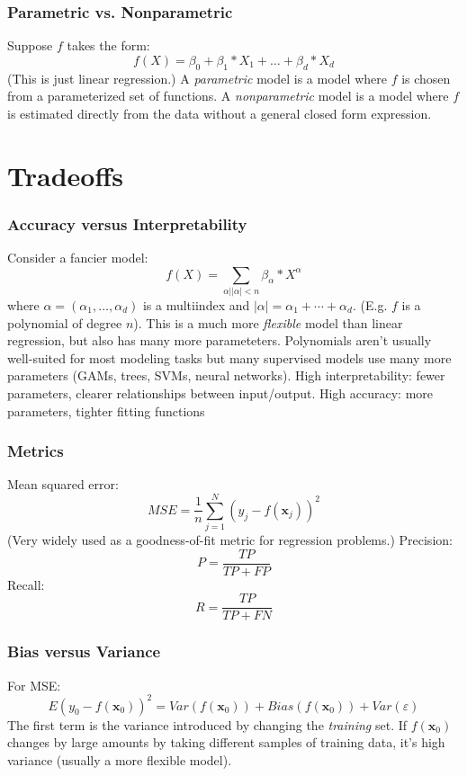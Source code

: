 \documentclass[
	11pt, %
]{beamer}
\begin{document}
\begin{frame}
	\frametitle{Parametric vs. Nonparametric}
	Suppose $f$ takes the form:
	\[ f(X) = \beta_0 + \beta_1*X_1 + \ldots + \beta_d * X_d \]
	\pause
	(This is just linear regression.)
	\vfill
	\pause
	A \emph{parametric} model is a model where $f$ is chosen from a parameterized set of functions.
	\vfill
	\pause
	A \emph{nonparametric} model is a model where $f$ is estimated directly from the data without a general closed form expression. 
	\vfill
\end{frame}

\section{Tradeoffs}
\begin{frame}
	\frametitle{Accuracy versus Interpretability}
	Consider a fancier model:
	\[
		f(X) = \sum_{\alpha | |\alpha| < n} \beta_\alpha * X^{\alpha}
	\]
	where $\alpha = (\alpha_1, \ldots, \alpha_d)$ is a multiindex and $|\alpha| = \alpha_1 + \cdots + \alpha_d$. (E.g. $f$ is a polynomial of degree $n$). 
	\vfill
	\pause
	This is a much more \emph{flexible} model than linear regression, but also has many more parameteters. 
	\vfill
	\pause
	Polynomials aren't usually well-suited for most modeling tasks but many supervised models use many more parameters (GAMs, trees, SVMs, neural networks). 
	\vfill
	\pause
	High interpretability: fewer parameters, clearer relationships between input/output.
	High accuracy: more parameters, tighter fitting functions
\end{frame}

\begin{frame}
	\frametitle{Metrics}
	Mean squared error:
	\[
		MSE = \frac{1}{n} \sum_{j=1}^N (y_j - f(\mathbf{x}_j))^2
	\]
	(Very widely used as a goodness-of-fit metric for regression problems.)
	\vfill
	\pause
	Precision:
	\[
		P = \frac{TP}{TP + FP}
	\]
	\vfill
	Recall:
	\[
		R = \frac{TP}{TP + FN}
	\]
\end{frame}

\begin{frame}
	\frametitle{Bias versus Variance}
	For MSE:
	\[ E(y_0 - f(\mathbf{x}_0))^2 = Var(f(\mathbf{x}_0)) + Bias(f(\mathbf{x}_0)) + Var(\varepsilon)\]
	\vfill
	\pause
	The first term is the variance introduced by changing the \emph{training} set. If $f(\mathbf{x}_0)$ changes by large amounts by taking different samples of training data, it's high variance (usually a more flexible model). 

	\vfill
\end{frame}
\end{document}
